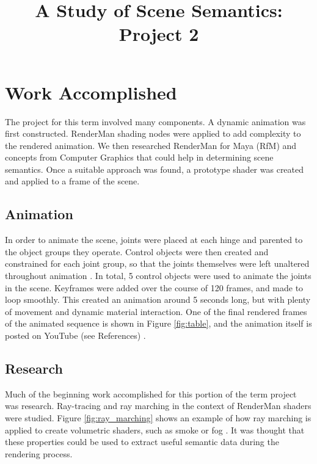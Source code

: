 \documentclass[conference]{IEEEtran}
\begin{document}
\title{A Study of Scene Semantics: Project 2}

\author{
}

\maketitle


\section{Work Accomplished}
\label{sec:work}
The project for this term involved many components.
A dynamic animation was first constructed.
RenderMan shading nodes were applied to add complexity to the rendered animation.
We then researched RenderMan for Maya (RfM) and concepts from Computer Graphics
that could help in determining scene semantics.
Once a suitable approach was found, a prototype shader was created and applied to a frame of the scene.

\subsection{Animation}
In order to animate the scene, joints were placed at each hinge and parented to the object groups they operate.
Control objects were then created and constrained for each joint group,
so that the joints themselves were left unaltered throughout animation \cite{rigging}.
In total, 5 control objects were used to animate the joints in the scene.
Keyframes were added over the course of 120 frames, and made to loop smoothly.
This created an animation around 5 seconds long,
but with plenty of movement and dynamic material interaction.
One of the final rendered frames of the animated sequence is shown in Figure \ref{fig:table}, and
the animation itself is posted on YouTube (see References) \cite{animation}.

\subsection{Research}
Much of the beginning work accomplished for this portion of the term project was research.
Ray-tracing and ray marching in the context of RenderMan shaders were studied.
Figure \ref{fig:ray_marching} shows an example of how ray marching is applied to
create volumetric shaders, such as smoke or fog \cite{ray_marching}.
It was thought that these properties could be used to extract useful semantic data
during the rendering process.
\end{document}
